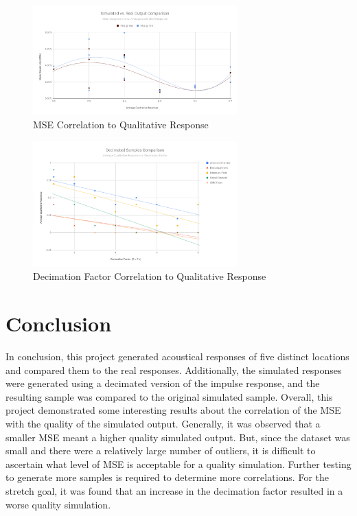 \documentclass[letterpaper, 11pt, onecolumn, oneside]{article}
\begin{document}
\begin{figure}[ht]
    \includegraphics[width=0.7\textwidth]{"img/plot_SimulatedVsRealOutput"}
    \centering
    \caption{MSE Correlation to Qualitative Response}
    \label{fig:mseCorrelation}
\end{figure}

\begin{figure}[ht]
    \includegraphics[width=0.7\textwidth]{"img/plot_DecimatedSamplesComparison"}
    \centering
    \caption{Decimation Factor Correlation to Qualitative Response}
    \label{fig:decimatedCorrelation}
\end{figure}

\clearpage
\section{Conclusion}
In conclusion, this project generated acoustical responses of five distinct locations and compared them to the real responses.
Additionally, the simulated responses were generated using a decimated version of the impulse response, and the resulting sample was compared to the original simulated sample.
Overall, this project demonstrated some interesting results about the correlation of the MSE with the quality of the simulated output.
Generally, it was observed that a smaller MSE meant a higher quality simulated output.
But, since the dataset was small and there were a relatively large number of outliers, it is difficult to ascertain what level of MSE is acceptable for a quality simulation.
Further testing to generate more samples is required to determine more correlations.
For the stretch goal, it was found that an increase in the decimation factor resulted in a worse quality simulation.
\end{document}
